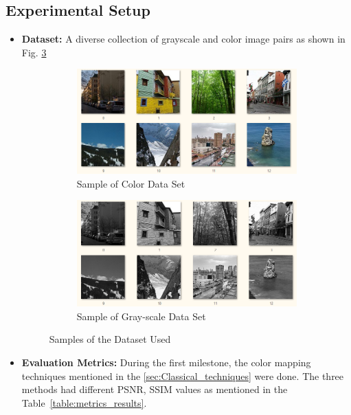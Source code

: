 \documentclass[conference]{IEEEtran}
\begin{document}
\subsection{Experimental Setup}
\begin{itemize}
\item \textbf{Dataset:} A diverse collection of grayscale and color image pairs as shown in Fig. \ref{fig:dataset_samples}

\begin{figure}[b]
    \centering
    \begin{subfigure}[b]{0.8\columnwidth}
        \centering
        \includegraphics[width=\linewidth]{dataset_color.png}
        \caption{Sample of Color Data Set}
        \label{fig:dataset_color}
    \end{subfigure}
    \quad
    \begin{subfigure}[b]{0.8\columnwidth}
        \centering
        \includegraphics[width=\linewidth]{dataset_gray.png}
        \caption{Sample of Gray-scale Data Set}
        \label{fig:dataset_gray}
    \end{subfigure}
    \caption{Samples of the Dataset Used}
    \label{fig:dataset_samples}
\end{figure}


\item \textbf{Evaluation Metrics:}
During the first milestone, the color mapping techniques mentioned in the \ref{sec:Classical_techniques} were done. The three methods had different PSNR, SSIM values as mentioned in the Table~\ref{table:metrics_results}.


\end{itemize}
\end{document}
